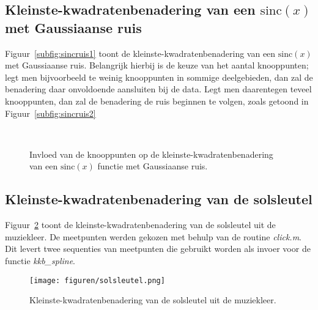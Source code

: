\documentclass[10pt,a4paper]{article}
\begin{document}
\subsection{Kleinste-kwadratenbenadering van een $\textrm{sinc}(x)$ met Gaussiaanse ruis}

Figuur~\ref{subfig:sincruis1} toont de kleinste-kwadratenbenadering van een $\textrm{sinc}(x)$ met Gaussiaanse ruis. Belangrijk hierbij is de keuze van het aantal knooppunten; legt men bijvoorbeeld te weinig knooppunten in sommige deelgebieden, dan zal de benadering daar onvoldoende aansluiten bij de data. Legt men daarentegen teveel knooppunten, dan zal de benadering de ruis beginnen te volgen, zoals getoond in Figuur~\ref{subfig:sincruis2}

\begin{figure}[h]
\centering
{}\hspace{0.5cm}
\\
\caption{Invloed van de knooppunten op de kleinste-kwadratenbenadering van een $\textrm{sinc}(x)$ functie met Gaussiaanse ruis.}
\label{fig:sincruis}
\end{figure}


\subsection{Kleinste-kwadratenbenadering van de solsleutel}

Figuur~\ref{fig:solsleutel} toont de kleinste-kwadratenbenadering van de solsleutel uit de muziekleer. De meetpunten werden gekozen met behulp van de routine \emph{click.m}. Dit levert twee sequenties van meetpunten die gebruikt worden als invoer voor de functie \emph{kkb\_spline}.

\begin{figure}[h]
	\centering
	\texttt{[image: figuren/solsleutel.png]}
	\caption{Kleinste-kwadratenbenadering van de solsleutel uit de muziekleer.}
	\label{fig:solsleutel}
\end{figure}
\end{document}
